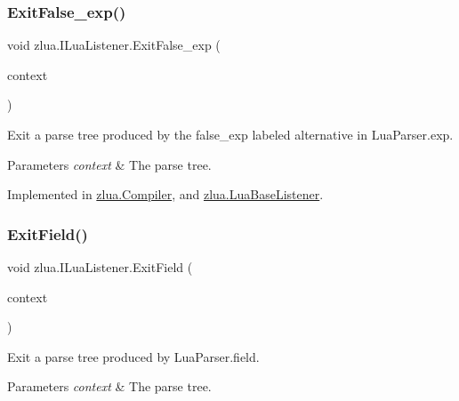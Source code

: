 \subsubsection{\texorpdfstring{Exit\+False\+\_\+exp()}{ExitFalse\_exp()}}
{\footnotesize\ttfamily void zlua.\+I\+Lua\+Listener.\+Exit\+False\+\_\+exp (\begin{DoxyParamCaption}\item[{\mbox{[}\+Not\+Null\mbox{]} \mbox{\hyperlink{classzlua_1_1_lua_parser_1_1_false__exp_context}{Lua\+Parser.\+False\+\_\+exp\+Context}}}]{context }\end{DoxyParamCaption})}



Exit a parse tree produced by the {\ttfamily false\+\_\+exp} labeled alternative in Lua\+Parser.\+exp. 


\begin{DoxyParams}{Parameters}
{\em context} & The parse tree.\\
\hline
\end{DoxyParams}


Implemented in \mbox{\hyperlink{classzlua_1_1_compiler_a0e5e286cdb08d9d9ef551f10f4447cf4}{zlua.\+Compiler}}, and \mbox{\hyperlink{classzlua_1_1_lua_base_listener_a6094ac0c604fce8ffab9ccfcf3023c52}{zlua.\+Lua\+Base\+Listener}}.

\mbox{\label{interfacezlua_1_1_i_lua_listener_aa5a80474f82e45908ec603e36a505f84}} 
\subsubsection{\texorpdfstring{Exit\+Field()}{ExitField()}}
{\footnotesize\ttfamily void zlua.\+I\+Lua\+Listener.\+Exit\+Field (\begin{DoxyParamCaption}\item[{\mbox{[}\+Not\+Null\mbox{]} \mbox{\hyperlink{classzlua_1_1_lua_parser_1_1_field_context}{Lua\+Parser.\+Field\+Context}}}]{context }\end{DoxyParamCaption})}



Exit a parse tree produced by Lua\+Parser.\+field. 


\begin{DoxyParams}{Parameters}
{\em context} & The parse tree.\\
\hline
\end{DoxyParams}


